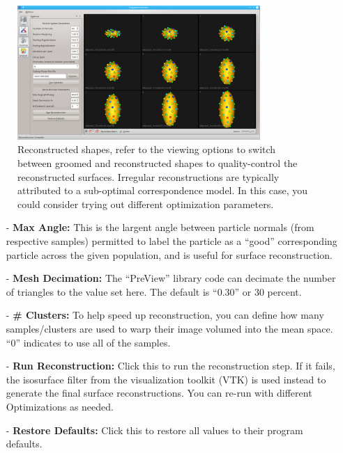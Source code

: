 \documentclass[letterpaper,12pt]{article}   %
\begin{document}
\begin{figure}[!htp]
	\centering
	\includegraphics[width=0.82\textwidth]{figs_v2/reconstructed.png}
	\caption{Reconstructed shapes, refer to the viewing options to switch between groomed and reconstructed shapes to quality-control the reconstructed surfaces. Irregular reconstructions are typically attributed to a sub-optimal correspondence model. In this case, you could consider trying out different optimization parameters.}
	\label{fig:reconstructed}
\end{figure}


\begin{itemize}
	\item[-] \textbf{Max Angle:} This is the largent angle between particle normals (from respective samples) permitted to label the particle as a “good” corresponding particle across the given population, and is useful for surface reconstruction.

	\item[-] \textbf{Mesh Decimation:} The “PreView” library code can decimate the number of triangles to the value set here. The default is “0.30” or 30 percent.

	\item[-] \textbf{\# Clusters:}  To help speed up reconstruction, you can define how many samples/clusters are used to warp their image volumed into the mean space. “0” indicates to use all of the samples.

	\item[-] \textbf{Run Reconstruction:}  Click this to run the reconstruction step. If it fails, the isosurface filter from the visualization toolkit (VTK) is used instead to generate the final surface reconstructions. You can re-run with different Optimizations as needed.

	\item[-] \textbf{Restore Defaults:}  Click this to restore all values to their program defaults.
\end{itemize}
\end{document}
